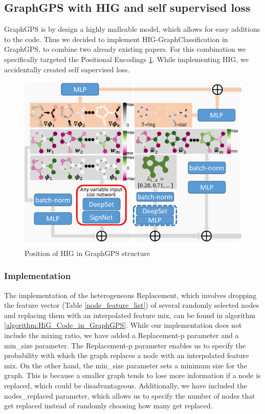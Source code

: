 \subsection{GraphGPS with HIG and self supervised loss}
\label{sec:graphgps_hig}
GraphGPS is by design a highly malleable model, which allows for easy additions to the code. Thus we decided to implement HIG-GraphClassification in GraphGPS, to combine two already existing papers. For this combination we specifically targeted the Positional Encodings \ref{fig:gps-hig-position}. While implementing HIG, we accidentally created self supervised loss.

\begin{figure}[ht]
    \centering
    \includegraphics[scale=0.2]{tex/res/gps_hig_position.png}
    \caption{Position of HIG in GraphGPS structure}
    \label{fig:gps-hig-position}
\end{figure}

\subsubsection{Implementation}

The implementation of the heterogeneous Replacement, which involves dropping the feature vector (Table \ref{node_feature_list}) of several randomly selected nodes and replacing them with an interpolated feature mix, can be found in algorithm \ref{algorithm:HiG_Code_in_GraphGPS}. While our implementation does not include the mixing ratio, we have added a Replacement-p parameter and a min\_size parameter. The Replacement-p parameter enables us to specify the probability with which the graph replaces a node with an interpolated feature mix. On the other hand, the min\_size parameter sets a minimum size for the graph. This is because a smaller graph tends to lose more information if a node is replaced, which could be disadvantageous. Additionally, we have included the nodes\_replaced parameter, which allows us to specify the number of nodes that get replaced instead of randomly choosing how many get replaced. \\\\

